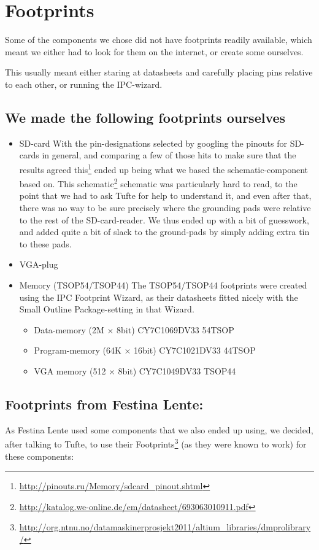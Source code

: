 \section {Footprints}
Some of the components we chose did not have footprints readily available, which
meant we either had to look for them on the internet, or create some ourselves.

This usually meant either staring at datasheets and carefully placing pins
relative to each other, or running the IPC-wizard.

\subsection {We made the following footprints ourselves}
\begin {itemize}
\item SD-card 
  With the pin-designations selected by googling the pinouts for SD-cards in
  general, and comparing a few of those hits to make sure that the results
  agreed this\footnote{\url{http://pinouts.ru/Memory/sdcard_pinout.shtml}} 
  ended up being what we based the schematic-component based on. This 
  schematic\footnote{\url{http://katalog.we-online.de/em/datasheet/693063010911.pdf}}
  schematic was particularly hard to read, to the point that we had to ask 
  Tufte for help to understand it, and even after that, there was no way to
  be sure precisely where the grounding pads were relative to the rest of the 
  SD-card-reader. We thus ended up with a bit of guesswork, and added quite a 
  bit of slack to the ground-pads by simply adding extra tin to these pads.
\item VGA-plug
\item Memory (TSOP54/TSOP44)
The TSOP54/TSOP44 footprints were created using the IPC Footprint Wizard, as
their datasheets fitted nicely with the Small Outline Package-setting in that
Wizard.

\begin {itemize}
\item Data-memory (2M $\times$ 8bit) CY7C1069DV33 54TSOP
\item Program-memory (64K $\times$ 16bit) CY7C1021DV33 44TSOP 
\item VGA memory (512 $\times$ 8bit) CY7C1049DV33 TSOP44 
\end {itemize}

\end {itemize}

\subsection{Footprints from Festina Lente:}
As Festina Lente used some components that we also ended up using, we decided,
after talking to Tufte, to use their Footprints\footnote{\url{http://org.ntnu.no/datamaskinerprosjekt2011/altium_libraries/dmprolibrary/}}
(as they were known to work) for these components:

